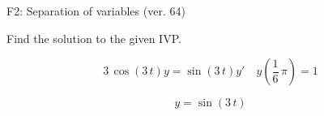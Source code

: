 \begin{exercise}
  \begin{exerciseTitle}F2: Separation of variables (ver. 64)\end{exerciseTitle}
  \begin{exerciseStatement}
    
Find the solution to the given IVP.

    
\[3 \, \cos\left(3 \, t\right) y= \sin\left(3 \, t\right) y'\hspace{1em} y\left( \frac{1}{6} \, \pi \right)= 1\]

  \end{exerciseStatement}
  \begin{exerciseAnswer}
    
\[y= \sin\left(3 \, t\right)\]

  \end{exerciseAnswer}
\end{exercise}